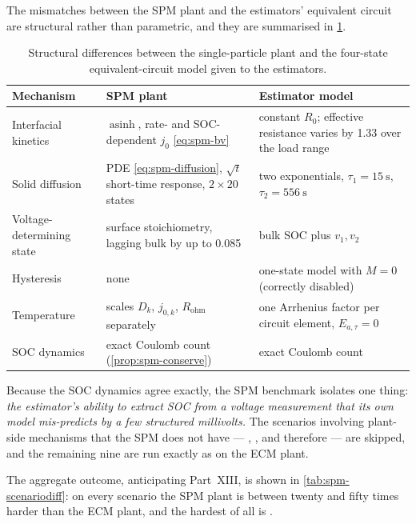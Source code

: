The mismatches between the SPM plant and the estimators' equivalent circuit are structural rather
than parametric, and they are summarised in \cref{tab:spm-mismatch}.

\begin{table}[H]\centering
\caption{Structural differences between the single-particle plant and the four-state
equivalent-circuit model given to the estimators.}
\label{tab:spm-mismatch}
\begin{tabular}{p{38mm}p{45mm}p{50mm}}\toprule
Mechanism & SPM plant & Estimator model \\ \midrule
Interfacial kinetics & $\operatorname{asinh}$, rate- and SOC-dependent $j_0$ \eqref{eq:spm-bv} &
 constant $R_0$; effective resistance varies by \num{1.33} over the load range \\
Solid diffusion & PDE \eqref{eq:spm-diffusion}, $\sqrt{t}$ short-time response, $2\times20$ states &
 two exponentials, $\tau_1=\SI{15}{\second}$, $\tau_2=\SI{556}{\second}$ \\
Voltage-determining state & surface stoichiometry, lagging bulk by up to \num{0.085} &
 bulk SOC plus $v_1,v_2$ \\
Hysteresis & none & one-state model with $M = 0$ (correctly disabled) \\
Temperature & scales $D_k$, $j_{0,k}$, $R_{\mathrm{ohm}}$ separately &
 one Arrhenius factor per circuit element, $E_{a,\tau}=0$ \\
SOC dynamics & exact Coulomb count (\cref{prop:spm-conserve}) & exact Coulomb count \\
\bottomrule\end{tabular}
\end{table}

Because the SOC dynamics agree exactly, the SPM benchmark isolates one thing: \emph{the
estimator's ability to extract SOC from a voltage measurement that its own model mis-predicts by
a few structured millivolts.} The scenarios involving plant-side mechanisms that the SPM does not
have --- , , and therefore  --- are skipped, and
the remaining nine are run exactly as on the ECM plant.

The aggregate outcome, anticipating Part~XIII, is shown in \cref{tab:spm-scenariodiff}: on every
scenario the SPM plant is between twenty and fifty times harder than the ECM plant, and the
hardest of all is .

